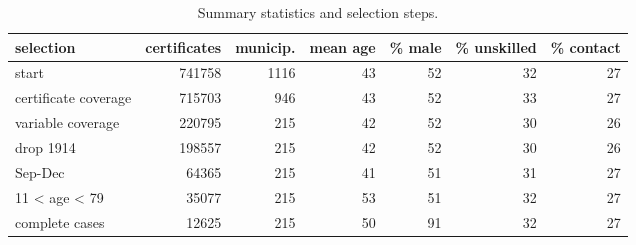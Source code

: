 \begin{table}

\caption{\label{tab:sumselect}Summary statistics and selection steps.}
\centering
\begin{tabular}[t]{l|r|r|r|r|r|r}
\hline
selection & certificates & municip. & mean age & \% male & \% unskilled & \% contact\\
\hline
start & 741758 & 1116 & 43 & 52 & 32 & 27\\
\hline
certificate coverage & 715703 & 946 & 43 & 52 & 33 & 27\\
\hline
variable coverage & 220795 & 215 & 42 & 52 & 30 & 26\\
\hline
drop 1914 & 198557 & 215 & 42 & 52 & 30 & 26\\
\hline
Sep-Dec & 64365 & 215 & 41 & 51 & 31 & 27\\
\hline
11 < age < 79 & 35077 & 215 & 53 & 51 & 32 & 27\\
\hline
complete cases & 12625 & 215 & 50 & 91 & 32 & 27\\
\hline
\end{tabular}
\end{table}
